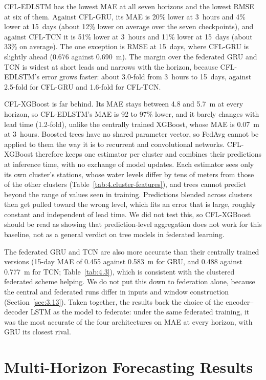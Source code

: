 CFL-EDLSTM has the lowest MAE at all seven horizons and the lowest RMSE at six of
them. Against CFL-GRU, its MAE is 20\% lower at 3~hours and 4\% lower at 15~days
(about 12\% lower on average over the seven checkpoints), and against CFL-TCN it
is 51\% lower at 3~hours and 11\% lower at 15~days (about 33\% on average). The
one exception is RMSE at 15~days, where CFL-GRU is slightly ahead (0.676 against
0.690~m). The margin over the federated GRU and TCN is widest at short leads and
narrows with the horizon, because CFL-EDLSTM's error grows faster: about 3.0-fold
from 3~hours to 15~days, against 2.5-fold for CFL-GRU and 1.6-fold for CFL-TCN.

CFL-XGBoost is far behind. Its MAE stays between 4.8 and 5.7~m at every horizon,
so CFL-EDLSTM's MAE is 92 to 97\% lower, and it barely changes with lead time
(1.2-fold), unlike the centrally trained XGBoost, whose MAE is 0.07~m at
3~hours. Boosted trees have no shared parameter vector, so FedAvg cannot be
applied to them the way it is to recurrent and convolutional networks.
CFL-XGBoost therefore keeps one estimator per cluster and combines their
predictions at inference time, with no exchange of model updates. Each estimator
sees only its own cluster's stations, whose water levels differ by tens of meters
from those of the other clusters (Table~\ref{tab:4.cluster-features}), and trees
cannot predict beyond the range of values seen in training. Predictions blended
across clusters then get pulled toward the wrong level, which fits an error that
is large, roughly constant and independent of lead time. We did not test this,
so CFL-XGBoost should be read as showing that prediction-level aggregation does
not work for this baseline, not as a general verdict on tree models in federated
learning.

The federated GRU and TCN are also more accurate than their centrally trained
versions (15-day MAE of 0.455 against 0.583~m for GRU, and 0.488 against 0.777~m
for TCN; Table~\ref{tab:4.3}), which is consistent with the clustered federated
scheme helping. We do not put this down to federation alone, because the central
and federated runs differ in inputs and window construction
(Section~\ref{sec:3.13}). Taken together, the results back the choice of the
encoder--decoder LSTM as the model to federate: under the same federated
training, it was the most accurate of the four architectures on MAE at every
horizon, with GRU its closest rival.



\section{Multi-Horizon Forecasting Results}
\label{sec:4.6}


